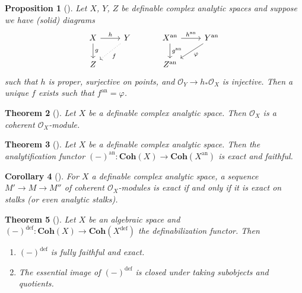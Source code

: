 \documentclass{amsart}
\newtheorem{theorem}{Theorem}[section]
\newtheorem{proposition}[theorem]{Proposition}
\newtheorem{corollary}[theorem]{Corollary}
\theoremstyle{definition}
\numberwithin{equation}{section}
\newcommand{\definable}{\mathrm{def}}
\newcommand{\analytic}{\mathrm{an}}
\begin{document}
\begin{proposition}[{\cite[Proposition 2.55]{zbMATH07662555}}]
    Let $X$, $Y$, $Z$ be definable complex analytic spaces and
    suppose we have (solid) diagrams
    \[
    \begin{tikzcd}
        X \ar[r,"h"] \ar[d,"g"] & Y\ar[dl,"f",dotted] \\ Z 
    \end{tikzcd}
    \hspace*{30pt}
    \begin{tikzcd}
        X^{\analytic} \ar[r,"h^{\analytic}"] \ar[d,"g^{\analytic}"] & Y^{\analytic}\ar[dl,"\varphi"] \\ Z^{\analytic} 
    \end{tikzcd}
    \]
    such that $h$ is proper, surjective on points,
    and $\mathcal{O}_Y \to h_*\mathcal{O}_X$ is injective.
    Then a unique $f$ exists such that $f^{\analytic} = \varphi$.
\end{proposition}

\begin{theorem}[{\cite[Theorem 2.38]{zbMATH07662555}}]
    Let $X$ be a definable complex analytic space.
    Then $\mathcal{O}_X$ is a coherent $\mathcal{O}_X$-module.
\end{theorem}

\begin{theorem}[{\cite[Theorem 2.39]{zbMATH07662555}}]
    Let $X$ be a definable complex analytic space.
    Then the analytification functor 
    $(-)^{\analytic}: \mathbf{Coh}(X) \to \mathbf{Coh}(X^{\analytic})$ is exact and faithful.
\end{theorem}

\begin{corollary}[{\cite[Corollary 2.40]{zbMATH07662555}}]
    For $X$ a definable complex analytic space,
    a sequence $M' \to M \to M''$ of coherent $\mathcal{O}_X$-modules
    is exact if and only if it is exact on stalks (or even analytic stalks).
\end{corollary}

\begin{theorem}[{\cite[Theorem 3.1]{zbMATH07662555}}]
    Let $X$ be an algebraic space and 
    $(-)^{\definable} : \mathbf{Coh}(X) \to \mathbf{Coh}(X^{\definable})$ the definabilization functor.
    Then 
    \begin{enumerate}[label = {(\arabic*)}]
        \item $(-)^{\definable}$ is fully faithful and exact.
        \item The essential image of $(-)^{\definable}$ is closed under taking subobjects and quotients.
    \end{enumerate}
\end{theorem}
\end{document}
